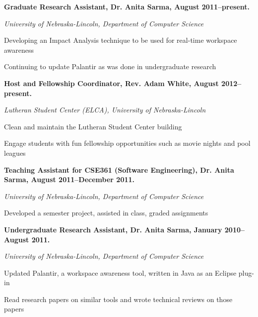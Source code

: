 \documentclass[10pt,letterpaper]{article}
\renewenvironment{itemize}{
  \begin{list}{}{
    \setlength{\leftmargin}{1.5em}
    \setlength{\itemsep}{0.25em}
    \setlength{\parskip}{0pt}
    \setlength{\parsep}{0.25em}
  }
}{
  \end{list}
}
\begin{document}
\begin{itemize}
\item \textbf{Graduate Research Assistant, Dr. Anita Sarma, August 2011--present.}
\item \emph{University of Nebraska-Lincoln, Department of Computer Science}
	\begin{itemize}
	\item Developing an Impact Analysis technique to be used for real-time workspace awareness
	\item Continuing to update Palantir as was done in undergraduate research
	\end{itemize}
\end{itemize}

\begin{itemize}
\item \textbf{Host and Fellowship Coordinator, Rev. Adam White, August 2012--present.}
\item \emph{Lutheran Student Center (ELCA), University of Nebraska-Lincoln}
    \begin{itemize}
    \item Clean and maintain the Lutheran Student Center building
    \item Engage students with fun fellowship opportunities such as movie nights and pool leagues
    \end{itemize}
\end{itemize}

\begin{itemize}
\item \textbf{Teaching Assistant for CSE361 (Software Engineering), Dr. Anita Sarma, August 2011--December 2011.}
\item \emph{University of Nebraska-Lincoln, Department of Computer Science}
	\begin{itemize}
    \item Developed a semester project, assisted in class, graded assignments
	\end{itemize}
\end{itemize}

\begin{itemize}
\item \textbf{Undergraduate Research Assistant, Dr. Anita Sarma, January 2010--August 2011.}
\item \emph{University of Nebraska-Lincoln, Department of Computer Science}
	\begin{itemize}
	\item Updated Palantir, a workspace awareness tool, written in Java as an Eclipse plug-in
	\item Read research papers on similar tools and wrote technical reviews on those papers
	\end{itemize}
\end{itemize}
\end{document}
